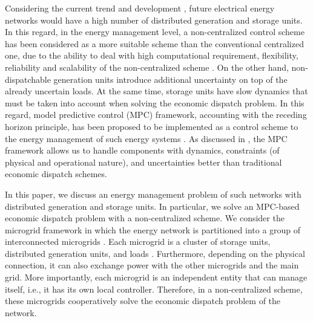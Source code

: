 


\vspace{-10pt}
Considering the current trend and development \cite{molzahn2017,morstyn2016}, future electrical energy networks would have a high number of distributed generation and storage units. In this regard, in the energy management level, a non-centralized control scheme has been considered as a more suitable scheme than the conventional centralized one, due to the ability to deal with high computational requirement, flexibility, reliability and scalability of the non-centralized scheme \cite{molzahn2017,morstyn2016}. On the other hand, non-dispatchable generation units introduce additional uncertainty on top of the already uncertain loads. At the same time, storage units have slow dynamics that must be taken into account when solving the economic dispatch problem. In this regard, model predictive control (MPC) framework, accounting with the receding horizon principle, has been proposed to be implemented as a control scheme to the energy management of such energy systems \cite{baker2016,wang2015}.   As discussed in \cite{parisio2017,zhu2014}, the MPC framework allows us to handle components with dynamics, constraints (of physical and operational nature), and uncertainties better than traditional economic dispatch schemes.  

\vspace{-5pt}
In this paper, we discuss an energy management problem of such networks with distributed generation and storage units. In particular, we solve an MPC-based economic dispatch problem with a non-centralized scheme. We consider the microgrid framework \cite{schwaegerl2013} in which the energy network is partitioned into a group of interconnected microgrids \cite{arefifar2012,barani2018}. Each microgrid is a cluster of storage units, distributed generation units, and loads \cite{arefifar2012}. Furthermore, depending on the physical connection, it can also exchange power with the other microgrids and the main grid. More importantly, each microgrid is an independent entity that can manage itself, i.e., it has its own local controller. Therefore, in a non-centralized scheme, these microgrids cooperatively solve the economic dispatch problem of the network. 


